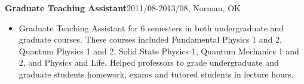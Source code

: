 \documentclass[margin, 10pt]{res} %
\begin{document}
\begin{resume}
\begin{itemize}
\end{itemize}
\textbf{Graduate Teaching Assistant}\hfill{2011/08-2013/08, Norman, OK}\\
\begin{itemize}
    \item Graduate Teaching Assistant for 6 semesters in both undergraduate and graduate courses. These courses included Fundamental Physics 1 and 2, Quantum Physics 1 and 2, Solid State Physics 1, Quantum Mechanics 1 and 2, and Physics and Life. Helped professors to grade undergraduate and graduate students homework, exams and tutored students in lecture hours.
\end{itemize}

    



\end{resume}
\end{document}
